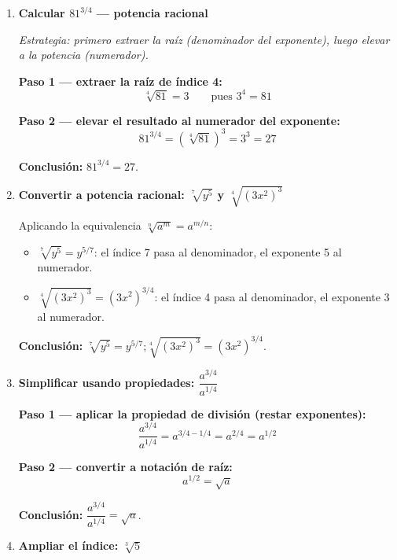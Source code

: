 \documentclass[11pt, letterpaper]{article}
\begin{document}
\begin{tcolorbox}[examplebox, title={Ejemplos}]
\begin{enumerate}[label=\textbf{Ej. \arabic*.}, leftmargin=*, itemsep=18pt]

\item \textbf{Calcular $81^{3/4}$ — potencia racional}

\textit{Estrategia: primero extraer la raíz (denominador del exponente), luego elevar a la potencia (numerador).}

\textbf{Paso 1 — extraer la raíz de índice 4:}
$$\sqrt[4]{81} = 3 \qquad\text{pues } 3^4 = 81$$

\textbf{Paso 2 — elevar el resultado al numerador del exponente:}
$$81^{3/4} = \left(\sqrt[4]{81}\right)^3 = 3^3 = 27$$

\textbf{Conclusión:} $81^{3/4} = 27$.

\item \textbf{Convertir a potencia racional: $\sqrt[7]{y^5}$ y $\sqrt[4]{(3x^2)^3}$}

Aplicando la equivalencia $\sqrt[n]{a^m} = a^{m/n}$:

\medskip
\begin{itemize}[itemsep=4pt]
  \item $\sqrt[7]{y^5} = y^{5/7}$: el índice 7 pasa al denominador, el exponente 5 al numerador.
  \item $\sqrt[4]{(3x^2)^3} = (3x^2)^{3/4}$: el índice 4 pasa al denominador, el exponente 3 al numerador.
\end{itemize}

\textbf{Conclusión:} $\sqrt[7]{y^5} = y^{5/7}$;\quad $\sqrt[4]{(3x^2)^3} = (3x^2)^{3/4}$.

\item \textbf{Simplificar usando propiedades: $\dfrac{a^{3/4}}{a^{1/4}}$}

\textbf{Paso 1 — aplicar la propiedad de división (restar exponentes):}
$$\frac{a^{3/4}}{a^{1/4}} = a^{3/4 - 1/4} = a^{2/4} = a^{1/2}$$

\textbf{Paso 2 — convertir a notación de raíz:}
$$a^{1/2} = \sqrt{a}$$

\textbf{Conclusión:} $\dfrac{a^{3/4}}{a^{1/4}} = \sqrt{a}$.

\item \textbf{Ampliar el índice: $\sqrt[3]{5}$}


\end{enumerate}
\end{tcolorbox}
\end{document}
